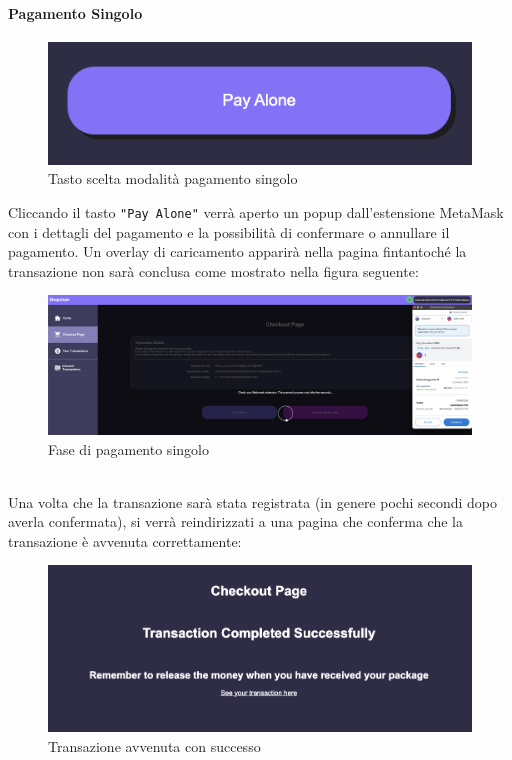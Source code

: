             \paragraph{Pagamento Singolo}
            \begin{figure}[H]
                \centering
                \includegraphics[scale=0.3]{immagini/Checkout/PayAlone.png}
                \caption{Tasto scelta modalità pagamento singolo}
            \end{figure}
            Cliccando il tasto \texttt{"Pay Alone"} verrà aperto un popup dall'estensione MetaMask con i dettagli del pagamento e la possibilità di confermare o annullare il pagamento. Un overlay di caricamento apparirà nella pagina \projectName{} fintantoché la transazione non sarà conclusa come mostrato nella figura seguente:
            \begin{figure}[H]
                \centering
                \includegraphics[scale=0.2]{immagini/Checkout/SinglePaymentLayer.png}
                \caption{Fase di pagamento singolo}
            \end{figure}
            \textbf{}\\
            Una volta che la transazione sarà stata registrata (in genere pochi secondi dopo averla confermata), si verrà reindirizzati a una pagina che conferma che la transazione è avvenuta correttamente:
            \begin{figure}[H]
                \centering
                \includegraphics[scale=0.3]{immagini/Checkout/PayAloneTransactionSuccess.png}
                \caption{Transazione avvenuta con successo}
            \end{figure}
